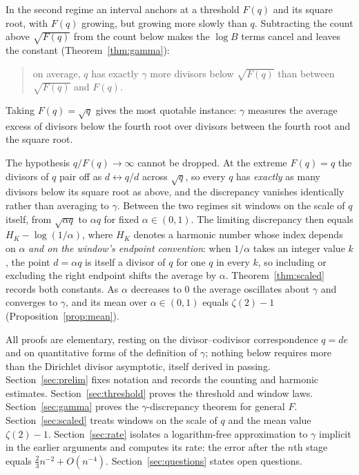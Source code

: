 \documentclass[11pt]{amsart}
\theoremstyle{remark}
\newcommand{\eul}{\gamma}
\begin{document}
In the second regime an interval anchors at a threshold $F(q)$ and its
square root, with $F(q)$ growing, but growing more slowly than $q$.
Subtracting the count above $\sqrt{F(q)}$ from the count below makes the
$\log B$ terms cancel and leaves the constant
(Theorem~\ref{thm:gamma}):
\begin{quotation}
\noindent
on average, $q$ has exactly $\eul$ more divisors below $\sqrt{F(q)}$
than between $\sqrt{F(q)}$ and $F(q)$.
\end{quotation}
Taking $F(q)=\sqrt q$ gives the most quotable instance: $\eul$ measures
the average excess of divisors below the fourth root over divisors
between the fourth root and the square root.

The hypothesis $q/F(q)\to\infty$ cannot be dropped.  At the extreme
$F(q)=q$ the divisors of $q$ pair off as $d\leftrightarrow q/d$ across
$\sqrt q$, so every $q$ has \emph{exactly} as many divisors below its
square root as above, and the discrepancy vanishes identically rather
than averaging to $\eul$.  Between the two regimes sit windows on the
scale of $q$ itself, from $\sqrt{\alpha q}$ to $\alpha q$ for fixed
$\alpha\in(0,1)$.  The limiting discrepancy then equals
$H_{K}-\log(1/\alpha)$, where $H_{K}$ denotes a harmonic number whose
index depends on $\alpha$ \emph{and on the window's endpoint
convention}: when $1/\alpha$ takes an integer value $k$, the point
$d=\alpha q$ is itself a divisor of $q$ for one $q$ in every $k$, so
including or excluding the right endpoint shifts the average by
$\alpha$.  Theorem~\ref{thm:scaled} records both constants.  As $\alpha$
decreases to $0$ the average oscillates about $\eul$ and converges to
$\eul$, and its mean over $\alpha\in(0,1)$ equals $\zeta(2)-1$
(Proposition~\ref{prop:mean}).

All proofs are elementary, resting on the divisor--codivisor
correspondence $q=de$ and on quantitative forms of the definition of
$\eul$; nothing below requires more than the Dirichlet divisor
asymptotic, itself derived in passing.  Section~\ref{sec:prelim} fixes
notation and records the counting and harmonic estimates.
Section~\ref{sec:threshold} proves the threshold and window laws.
Section~\ref{sec:gamma} proves the $\eul$-discrepancy theorem for
general $F$.  Section~\ref{sec:scaled} treats windows on the scale of
$q$ and the mean value $\zeta(2)-1$.  Section~\ref{sec:rate} isolates a
logarithm-free approximation to $\eul$ implicit in the earlier
arguments and computes its rate: the error after the $n$th stage equals
$\tfrac{2}{3}n^{-2}+O(n^{-4})$.  Section~\ref{sec:questions} states
open questions.
\end{document}
